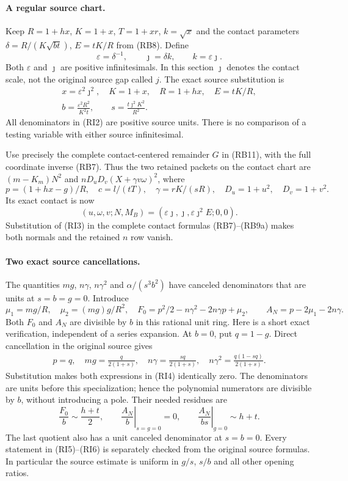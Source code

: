 \paragraph{A regular source chart.}
Keep $R=1+hx$, $K=1+x$, $T=1+xr$, $k=\sqrt{x}$ and the contact
parameters $\delta=R/(K\sqrt{bt})$, $E=tK/R$ from (RB8). Define
\[
 \varepsilon=\delta^{-1},\qquad \jmath=\delta k,
 \qquad k=\varepsilon\jmath.
 \tag{RI1}
\]
Both $\varepsilon$ and $\jmath$ are positive infinitesimals. In this
section $\jmath$ denotes the contact scale, not the original source
gap called $j$. The exact source substitution is
\[
 \begin{gathered}
 x=\varepsilon^2\jmath^2,\quad K=1+x,\quad R=1+hx,\quad
 E=tK/R,\\
 b=\frac{\varepsilon^2R^2}{K^2t},\qquad
 s=\frac{t\jmath^2K^2}{R^2}.
 \end{gathered}                                                   \tag{RI2}
\]
All denominators in (RI2) are positive source units. There is no
comparison of a testing variable with either source infinitesimal.

Use precisely the complete contact-centered remainder $G$ in (RB11),
with the full coordinate inverse (RB7). Thus the two retained packets
on the contact chart are $(m-K_m)N^2$ and
$nD_uD_v(X+\gamma v\omega)^2$, where
\[
 p=(1+hx-g)/R,\quad c=l/(tT),\quad
 \gamma=rK/(sR),\quad D_u=1+u^2,\quad D_v=1+v^2.
\]
Its exact contact is now
\[
 (u,\omega,v;N,M_B)
   =(\varepsilon\jmath,\jmath,\varepsilon\jmath^2E;0,0).
 \tag{RI3}
\]
Substitution of (RI3) in the complete contact formulas
(RB7)--(RB9a) makes both normals and the retained $n$ row vanish.

\paragraph{Two exact source cancellations.}
The quantities $mg$, $n\gamma$, $n\gamma^2$ and
$\alpha/(s^3b^2)$ have canceled denominators that are units at
$s=b=g=0$. Introduce
\[
 \mu_1=mg/R,\quad \mu_2=(mg)g/R^2,\quad
 F_0=p^2/2-n\gamma^2-2n\gamma p+\mu_2,\qquad
 A_N=p-2\mu_1-2n\gamma.
 \tag{RI4}
\]
Both $F_0$ and $A_N$ are divisible by $b$ in this rational unit ring.
Here is a short exact verification, independent of a series expansion.
At $b=0$, put $q=1-g$. Direct cancellation in the original source gives
\[
 \begin{gathered}
 p=q,\quad mg=\frac{q}{2(1+s)},\quad
 n\gamma=\frac{sq}{2(1+s)},\quad
 n\gamma^2=\frac{q(1-sq)}{2(1+s)}.
 \end{gathered}                                                    \tag{RI5}
\]
Substitution makes both expressions in (RI4) identically zero.
The denominators are units before this specialization; hence the
polynomial numerators are divisible by $b$, without introducing a
pole. Their needed residues are
\[
 \frac{F_0}{b}\sim\frac{h+t}{2},\qquad
 \left.\frac{A_N}{b}\right|_{s=g=0}=0,\qquad
 \left.\frac{A_N}{bs}\right|_{g=0}\sim h+t.
 \tag{RI6}
\]
The last quotient also has a unit canceled denominator at $s=b=0$.
Every statement in (RI5)--(RI6) is separately checked from the original
source formulas. In particular the source estimate is uniform in
$g/s$, $s/b$ and all other opening ratios.

